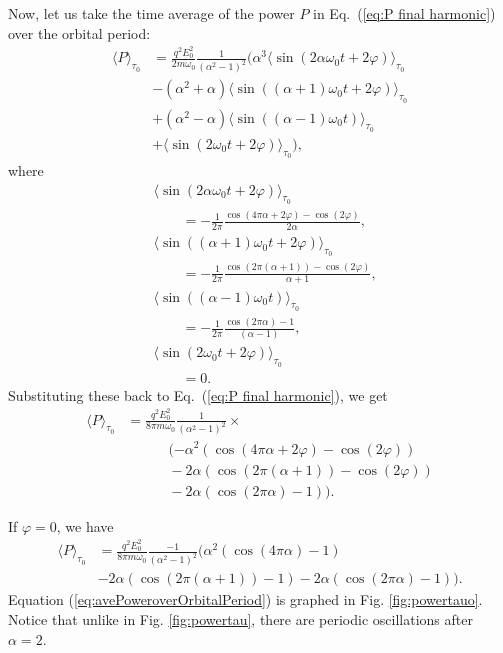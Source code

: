 \documentclass[twocolumn,showpacs,preprintnumbers,amsmath,amssymb]{revtex4}
\begin{document}
Now, let us take the time average of the power $P$ in Eq.~(\ref{eq:P final harmonic}) over the orbital period:
\begin{align}
\label{eq:P final harmonic}
\langle P\rangle_{\tau_0} &= \frac{q^2E_0^2}{2m\omega_0}\frac{1}{(\alpha^2 - 1)^2}(\alpha^3\langle\sin(2\alpha\omega_0t + 2\varphi)\rangle_{\tau_0} \nonumber \\
&- (\alpha^2 +\alpha)\langle\sin((\alpha + 1)\omega_0t + 2\varphi)\rangle_{\tau_0} \nonumber\\
& + (\alpha^2 -\alpha)\langle\sin((\alpha -1)\omega_0t)\rangle_{\tau_0} \nonumber \\
& + \langle\sin(2\omega_0t+2\varphi)\rangle_{\tau_0}),
\end{align}
where
\begin{subequations}
\begin{align}
&\langle\sin(2\alpha\omega_0t + 2\varphi)\rangle_{\tau_0} \nonumber \\
&\qquad= -\frac{1}{2\pi}\frac{\cos(4\pi\alpha+2\varphi)-\cos(2\varphi)}{2\alpha},\\
&\langle\sin((\alpha + 1)\omega_0t + 2\varphi)\rangle_{\tau_0} \nonumber\\
&\qquad= -\frac{1}{2\pi} \frac{\cos(2\pi(\alpha +1))-\cos(2\varphi)}{\alpha+1},\\
&\langle\sin((\alpha -1)\omega_0t)\rangle_{\tau_0} \nonumber \\
&\qquad= -\frac{1}{2\pi}\frac{\cos(2\pi\alpha)-1}{(\alpha-1)},\\
&\langle\sin(2\omega_0t +2\varphi)\rangle_{\tau_0} \nonumber \\
&\qquad= 0.
\end{align}
\end{subequations}
Substituting these back to Eq.~(\ref{eq:P final harmonic}), we get
\begin{align}
\langle P\rangle_{\tau_0} &= \frac{q^2E_0^2}{8\pi m\omega_0}\frac{1}{(\alpha^2 - 1)^2}\times \nonumber \\
& \qquad \quad (-\alpha^2(\cos(4\pi\alpha + 2\varphi)-\cos(2\varphi))  \nonumber\\
&\qquad\quad -2\alpha(\cos(2\pi(\alpha + 1)) - \cos(2\varphi)) \nonumber \\
&\qquad \quad - 2\alpha (\cos(2\pi\alpha)-1)) .
\end{align}

If $\varphi=0$, we have
\begin{align}
\label{eq:avePoweroverOrbitalPeriod}
\langle P\rangle_{\tau_0} &= \frac{q^2E_0^2}{8\pi m\omega_0}\frac{-1}{(\alpha^2 - 1)^2}(\alpha^2(\cos(4\pi\alpha)-1)  \nonumber\\
& -2\alpha(\cos(2\pi(\alpha + 1)) - 1) - 2\alpha (\cos(2\pi\alpha)-1)).
\end{align}
Equation (\ref{eq:avePoweroverOrbitalPeriod}) is graphed in Fig. \ref{fig:powertauo}. Notice that unlike in Fig. \ref{fig:powertau}, there are periodic oscillations after $\alpha=2$. 
\end{document}
